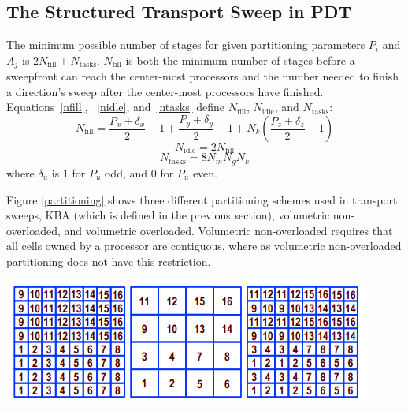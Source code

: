 \documentclass[11pt, letterpaper,titlepage,oneside]{article}
\begin{document}
\subsection{The Structured Transport Sweep in PDT}
The minimum possible number of stages for given partitioning parameters $P_i$ and $A_j$ is $2 N_{\text{fill}}+N_{\text{tasks}}$. $N_{\text{fill}}$ is both the minimum number of stages before a sweepfront can reach the center-most processors and the number needed to finish a direction's sweep after the center-most processors have finished. Equations~\eqref{nfill}, ~\eqref{nidle}, and~\eqref{ntasks} define $N_{\text{fill}}$, $N_{\text{idle}}$, and $N_{\text{tasks}}$:
\begin{equation}
N_{\text{fill}} = \frac{P_x + \delta_x}{2} - 1 + \frac{P_y + \delta_y}{2} - 1 + N_k (\frac{P_z + \delta_z}{2} - 1)
\label{nfill}
\end{equation}
\begin{equation}
N_{\text{idle}} = 2 N_{\text{fill}}
\label{nidle}
\end{equation}
\begin{equation}
N_{\text{tasks}} = 8 N_m N_g N_k
\label{ntasks}
\end{equation}
where $\delta_u$ is 1 for $P_u$ odd, and 0 for $P_u$ even.

Figure \ref{partitioning} shows three different partitioning schemes used in transport sweeps, KBA (which is defined in the previous section), volumetric non-overloaded, and volumetric overloaded. Volumetric non-overloaded requires that all cells owned by a processor are contiguous, where as volumetric non-overloaded partitioning does not have this restriction.  

\noindent\begin{minipage}{\textwidth}
\centering
\includegraphics[scale = 1]{../figures/Partitioning.PNG}
\label{partitioning}
\end{minipage}
\end{document}
